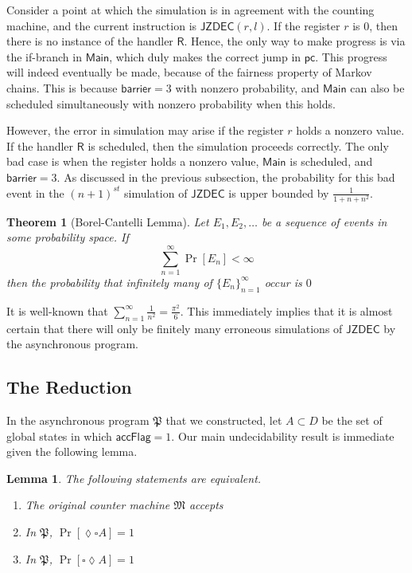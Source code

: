 \documentclass{article}
\newtheorem{theorem}[definition]{Theorem}
\newtheorem{lemma}[definition]{Lemma}
\theoremstyle{remark}
\newcommand{\program}{\mathfrak{P}}
\newcommand{\machine}{\mathfrak{M}}
\newcommand{\jzdec}{\mathsf{JZDEC}}
\newcommand{\pc}{\mathsf{pc}}
\newcommand{\main}{\mathsf{Main}}
\newcommand{\accflag}{\mathsf{accFlag}}
\newcommand{\barrier}{\mathsf{barrier}}
\begin{document}
Consider a point at which the simulation is in agreement with the counting machine, and the current instruction is $\jzdec(r, l)$. If the register $r$ is $0$, then there is no instance of the handler $\mathsf{R}$. Hence, the only way to make progress is via the if-branch in $\main$, which duly makes the correct jump in $\pc$. This progress will indeed eventually be made, because of the fairness property of Markov chains. This is because $\barrier = 3$ with nonzero probability, and $\main$ can also be scheduled simultaneously with nonzero probability when this holds. 

However, the error in simulation may arise if the register $r$ holds a nonzero value. If the handler $\mathsf{R}$ is scheduled, then the simulation proceeds correctly. The only bad case is when the register holds a nonzero value, $\main$ is scheduled, and $\barrier = 3$. As discussed in the previous subsection, the probability for this bad event in the $(n+1)^{st}$ simulation of $\jzdec$ is upper bounded by $\frac{1}{1+n+n^2}$.

\begin{theorem}[Borel-Cantelli Lemma]
Let $E_1, E_2, \dots$ be a sequence of events in some probability space. If
$$
\sum_{n=1}^\infty \Pr[E_n] < \infty
$$
then the probability that infinitely many of $\{E_n\}_{n=1}^\infty$ occur is $0$
\end{theorem}

It is well-known that $\sum_{n=1}^\infty \frac{1}{n^2} = \frac{\pi^2}{6}$. This immediately implies that it is almost certain that there will only be finitely many erroneous simulations of $\jzdec$ by the asynchronous program.

\subsection{The Reduction}
In the asynchronous program $\program$ that we constructed, let $A \subset D$ be the set of global states in which $\accflag = 1$. Our main undecidability result is immediate given the following lemma.
\begin{lemma}
The following statements are equivalent.
\begin{enumerate}
\item The original counter machine $\machine$ accepts
\item In $\program$, $\Pr[\lozenge \square A] = 1$
\item In $\program$, $\Pr[\square \lozenge A] = 1$
\end{enumerate}
\end{lemma}
\end{document}
